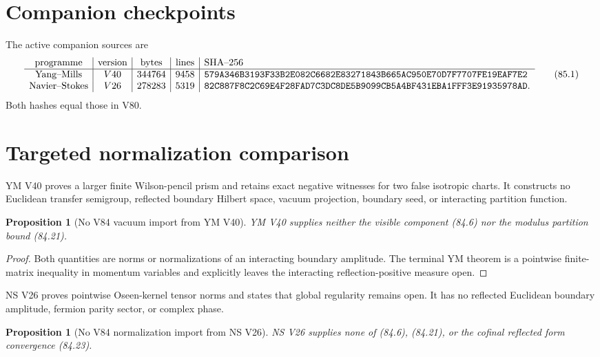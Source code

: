 \documentclass[11pt]{article}
\newtheorem{proposition}[theorem]{Proposition}
\theoremstyle{remark}
\begin{document}
\section{Companion checkpoints}

The active companion sources are
\[
\begin{array}{c|c|c|c|l}
\hbox{programme}&\hbox{version}&\hbox{bytes}&\hbox{lines}&\hbox{SHA--256}\\ \hline
\hbox{Yang--Mills}&V40&344764&9458&
\texttt{579A346B3193F33B2E082C6682E83271843B665AC950E70D7F7707FE19EAF7E2}\\
\hbox{Navier--Stokes}&V26&278283&5319&
\texttt{82C887F8C2C69E4F28FAD7C3DC8DE5B9099CB5A4BF431EBA1FFF3E91935978AD}.
\end{array}                                             \tag{85.1}
\]
Both hashes equal those in V80.

\section{Targeted normalization comparison}

YM V40 proves a larger finite Wilson-pencil prism and retains exact
negative witnesses for two false isotropic charts.  It constructs
no Euclidean transfer semigroup, reflected boundary Hilbert space,
vacuum projection, boundary seed, or interacting partition
function.

\begin{proposition}[No V84 vacuum import from YM V40]
\label{prop:v15v85-ym}
YM V40 supplies neither the visible component (84.6) nor the
modulus partition bound (84.21).
\end{proposition}

\begin{proof}
Both quantities are norms or normalizations of an interacting
boundary amplitude.  The terminal YM theorem is a pointwise
finite-matrix inequality in momentum variables and explicitly
leaves the interacting reflection-positive measure open.
\end{proof}

NS V26 proves pointwise Oseen-kernel tensor norms and states that
global regularity remains open.  It has no reflected Euclidean
boundary amplitude, fermion parity sector, or complex phase.

\begin{proposition}[No V84 normalization import from NS V26]
\label{prop:v15v85-ns}
NS V26 supplies none of (84.6), (84.21), or the cofinal reflected
form convergence (84.23).
\end{proposition}
\end{document}
